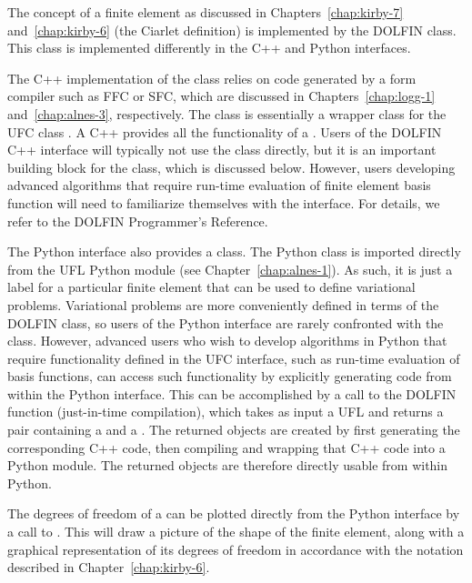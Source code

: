 The concept of a finite element as discussed in
Chapters~\ref{chap:kirby-7} and~\ref{chap:kirby-6} (the Ciarlet
definition) is implemented by the DOLFIN  class. This
class is implemented differently in the C++ and Python interfaces.

The C++ implementation of the  class relies on
code generated by a form compiler such as FFC or SFC, which are discussed
in Chapters~\ref{chap:logg-1} and~\ref{chap:alnes-3}, respectively. The
class  is essentially a wrapper class for the UFC class
. A C++  provides all
the functionality of a . Users of the DOLFIN C++
interface will typically not use the  class directly,
but it is an important building block for the  class, which
is discussed below. However, users developing advanced algorithms that
require run-time evaluation of finite element basis function will need
to familiarize themselves with the  interface. For
details, we refer to the DOLFIN Programmer's Reference.

The Python interface also provides a  class.
The Python  class is
imported directly from the UFL Python module (see
Chapter~\ref{chap:alnes-1}). As such, it is just a label for a
particular finite element that can be used to define variational
problems. Variational problems are more conveniently defined in
terms of the DOLFIN  class,
so users of the Python interface are rarely confronted with
the  class. However, advanced users who wish to
develop algorithms in Python that require functionality defined in the
UFC interface, such as run-time evaluation of basis functions, can
access such functionality by explicitly generating code from within
the Python interface. This can be accomplished by a call to the
DOLFIN  function (just-in-time compilation), which takes as
input a UFL  and returns a pair containing a
 and a . The returned
objects are created by first generating the corresponding C++ code,
then compiling and wrapping that C++ code into a Python module. The
returned objects are therefore directly usable from within Python.

The degrees of freedom of a  can be plotted directly
from the Python interface by a call to . This will
draw a picture of the shape of the finite element, along with a graphical
representation of its degrees of freedom in accordance with the notation
described in Chapter~\ref{chap:kirby-6}.

